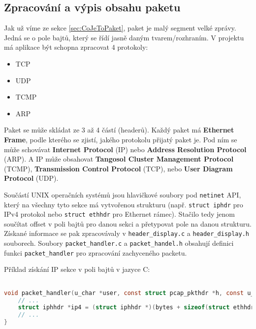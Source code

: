 \documentclass[a4paper,11pt]{article}
\begin{document}
    \subsection{Zpracování a výpis obsahu paketu}
    Jak už víme ze sekce \ref{sec:CoJeToPaket}, paket je malý segment velké zprávy. Jedná se o pole bajtů, který se řídí jasně daným tvarem/rozhraním.
    V projektu má aplikace být schopna zpracovat 4 protokoly:
    \begin{itemize}
        \item TCP
        \item UDP
        \item TCMP
        \item ARP
    \end{itemize}
    Paket se může skládat ze 3 až 4 částí (headerů). Každý paket má \textbf{Ethernet Frame}, podle kterého se zjistí, jakého protokolu přijatý paket je.
    Pod ním se může schovávat \textbf{Internet Protocol} (IP) nebo \textbf{Address Resolution Protocol} (ARP). A IP může obsahovat \textbf{Tangosol Cluster Management Protocol} (TCMP), \textbf{Transmission Control Protocol} (TCP), nebo \textbf{User Diagram Protocol} (UDP).

    Součástí UNIX operačních systémů jsou hlavičkové soubory pod \verb|netinet| API, který na všechny tyto sekce má vytvořenou strukturu (např. \verb|struct iphdr| pro IPv4 protokol nebo \verb|struct ethhdr| pro Ethernet rámec).
    Stačilo tedy jenom součítat offset v poli bajtů pro danou sekci a přetypovat pole na danou strukturu. Získané informace se pak zpracovávaly v \verb|header_display.c| a \verb|header_display.h| souborech.
    Soubory \verb|packet_handler.c| a \verb|packet_handel.h| obsahují definici funkci \verb|packet_handler| pro zpracování zachyceného packetu.

    Příklad získání IP sekce v poli bajtů v jazyce C:
    \begin{lstlisting}[language=C,
                       backgroundcolor=\color{gray},
                       keywordstyle=\color{darkred},
                       commentstyle=\color{blue},
                       basicstyle=\ttfamily\footnotesize,
                       breaklines=true,
                       showstringspaces=false]

void packet_handler(u_char *user, const struct pcap_pkthdr *h, const u_char *bytes) {
    // ...
    struct iphhdr *ip4 = (struct iphhdr *)(bytes + sizeof(struct ethhdr));
    // ...
}
        
    \end{lstlisting}
    
\end{document}
